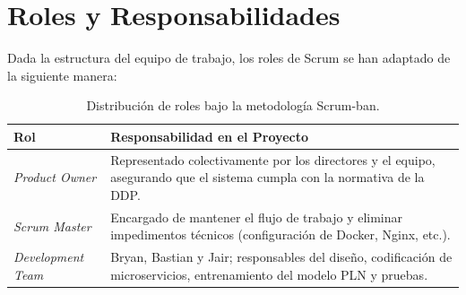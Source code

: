 \section{Roles y Responsabilidades}
Dada la estructura del equipo de trabajo, los roles de Scrum se han adaptado de la siguiente manera:
\begin{table}[htbp]
\centering
\small
\begin{tabular}{|l|p{9cm}|}
\hline
\textbf{Rol} & \textbf{Responsabilidad en el Proyecto} \\ \hline
\textit{Product Owner} & Representado colectivamente por los directores y el equipo, asegurando que el sistema cumpla con la normativa de la DDP. \\ \hline
\textit{Scrum Master} & Encargado de mantener el flujo de trabajo y eliminar impedimentos técnicos (configuración de Docker, Nginx, etc.). \\ \hline
\textit{Development Team} & Bryan, Bastian y Jair; responsables del diseño, codificación de microservicios, entrenamiento del modelo PLN y pruebas. \\ \hline
\end{tabular}
\caption{Distribución de roles bajo la metodología Scrum-ban.}
\end{table}
